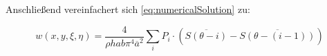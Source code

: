 \newpage

Anschließend vereinfachert sich \ref{eq:numericalSolution} zu:

\begin{equation}
w(x,y,\xi, \eta) = \frac{4}{\rho h a b \pi^4 \overline{a}^2} \sum_i P_i \cdot (\overline{S(\theta - i)} - \overline{S(\theta - (i-1))})
\end{equation}




